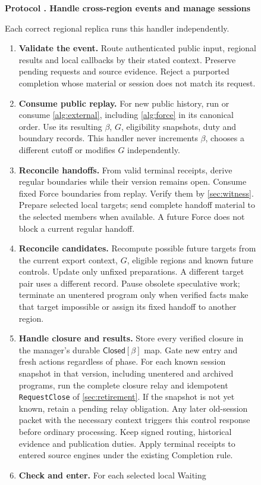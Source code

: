 \documentclass[11pt,a4paper]{article}
\newcommand{\tagg}[1]{\ensuremath{\mathsf{#1}}}
\newcounter{protocol}
\newenvironment{protocol}[3][htbp]{\begin{figure}[#1]\refstepcounter{protocol}\label{#2}
\begin{mdframed}[linewidth=.6pt,skipabove=0pt,skipbelow=0pt,
innertopmargin=7pt,innerbottommargin=7pt]\small
\textbf{Protocol \theprotocol. #3}\par\smallskip}{\end{mdframed}\end{figure}}
\begin{document}
\begin{protocol}[H]{alg:rotation}{Handle cross-region events and manage sessions}
Each correct regional replica runs this handler independently.
\begin{enumerate}[label=\textbf{\arabic*)},itemsep=3pt]
\item \textbf{Validate the event.} Route authenticated public input,
regional results and local callbacks by their stated context. Preserve
pending requests and source evidence. Reject a purported completion
whose material or session does not match its request.
\item \textbf{Consume public replay.} For new public history, run or
consume \cref{alg:external}, including \cref{alg:force} in its canonical
order. Use its resulting $\beta$, $G$, eligibility snapshots, duty and
boundary records. This handler never increments $\beta$, chooses a
different cutoff or modifies $G$ independently.
\item \textbf{Reconcile handoffs.} From valid terminal receipts,
derive regular boundaries while their version remains open. Consume
fixed Force boundaries from replay. Verify them by
\cref{sec:witness}. Prepare selected local targets; send complete
handoff material to the selected members when available. A future
Force does not block a current regular handoff.
\item \textbf{Reconcile candidates.} Recompute possible future
targets from the current export context, $G$, eligible regions and
known future controls. Update only unfixed preparations. A different
target pair uses a different record. Pause obsolete speculative work;
terminate an unentered program only when verified facts make that
target impossible or assign its fixed handoff to another region.
\item \textbf{Handle closure and results.} Store every verified closure
in the manager's durable $\tagg{Closed}[\beta]$ map. Gate new entry and
fresh actions regardless of phase. For each known session snapshot in
that version, including unentered and archived programs, run the complete
closure relay and idempotent \texttt{RequestClose} of \cref{sec:retirement}.
If the snapshot is not yet known, retain a pending relay obligation.
Any later old-session packet with the necessary context triggers this
control response before ordinary processing. Keep signed routing,
historical evidence and publication duties. Apply terminal receipts
to entered source engines under the existing Completion rule.
\item \textbf{Check and enter.} For each selected local Waiting

\end{enumerate}
\end{protocol}
\end{document}
